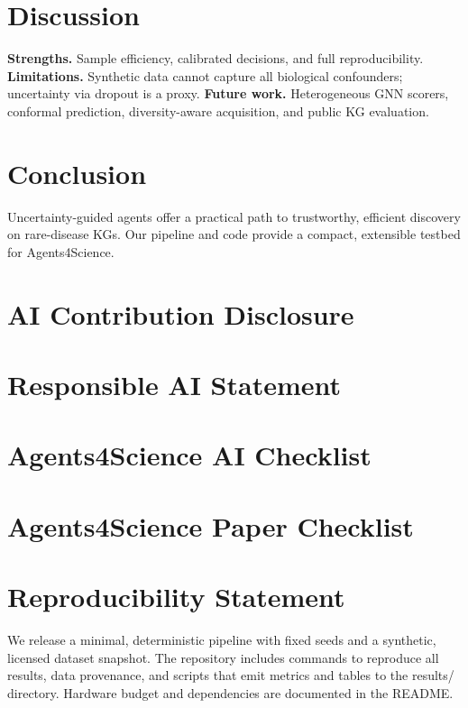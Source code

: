 \documentclass{article}
\begin{document}
\section{Discussion}
\textbf{Strengths.} Sample efficiency, calibrated decisions, and full reproducibility. \textbf{Limitations.} Synthetic data cannot capture all biological confounders; uncertainty via dropout is a proxy. \textbf{Future work.} Heterogeneous GNN scorers, conformal prediction, diversity-aware acquisition, and public KG evaluation.

\section{Conclusion}
Uncertainty-guided agents offer a practical path to trustworthy, efficient discovery on rare-disease KGs. Our pipeline and code provide a compact, extensible testbed for Agents4Science.




\clearpage
\section*{AI Contribution Disclosure}


\section*{Responsible AI Statement}


\section*{Agents4Science AI Checklist}


\section*{Agents4Science Paper Checklist}


\section*{Reproducibility Statement}
We release a minimal, deterministic pipeline with fixed seeds and a synthetic, licensed dataset snapshot. The repository includes commands to reproduce all results, data provenance, and scripts that emit metrics and tables to the results/ directory. Hardware budget and dependencies are documented in the README.
\end{document}
